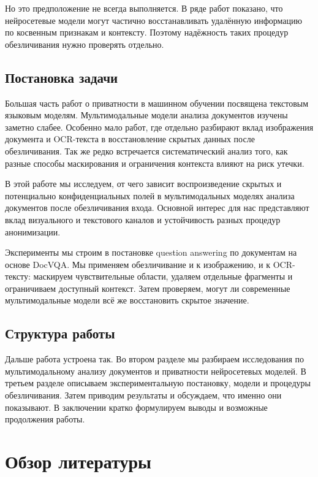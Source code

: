 \documentclass[a4paper,12pt]{extarticle}
\begin{document}
Но это предположение не всегда выполняется. В ряде работ показано, что нейросетевые модели могут частично восстанавливать удалённую информацию по косвенным признакам и контексту. Поэтому надёжность таких процедур обезличивания нужно проверять отдельно.

\subsection{Постановка задачи}

Большая часть работ о приватности в машинном обучении посвящена текстовым языковым моделям. Мультимодальные модели анализа документов изучены заметно слабее. Особенно мало работ, где отдельно разбирают вклад изображения документа и OCR-текста в восстановление скрытых данных после обезличивания. Так же редко встречается систематический анализ того, как разные способы маскирования и ограничения контекста влияют на риск утечки.

В этой работе мы исследуем, от чего зависит воспроизведение скрытых и потенциально конфиденциальных полей в мультимодальных моделях анализа документов после обезличивания входа. Основной интерес для нас представляют вклад визуального и текстового каналов и устойчивость разных процедур анонимизации.

Эксперименты мы строим в постановке question answering по документам на основе DocVQA. Мы применяем обезличивание и к изображению, и к OCR-тексту: маскируем чувствительные области, удаляем отдельные фрагменты и ограничиваем доступный контекст. Затем проверяем, могут ли современные мультимодальные модели всё же восстановить скрытое значение.

\subsection{Структура работы}

Дальше работа устроена так. Во втором разделе мы разбираем исследования по мультимодальному анализу документов и приватности нейросетевых моделей. В третьем разделе описываем экспериментальную постановку, модели и процедуры обезличивания. Затем приводим результаты и обсуждаем, что именно они показывают. В заключении кратко формулируем выводы и возможные продолжения работы.





\section{Обзор литературы}
\end{document}
